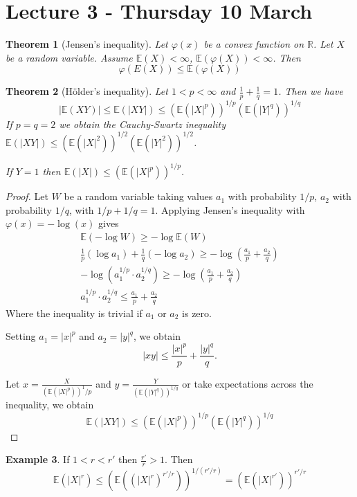 \documentclass[10pt, oneside, reqno]{amsart}
\theoremstyle{plain}%
\newtheorem{thm}{Theorem}[section]
\theoremstyle{definition}
\newtheorem{exmp}[thm]{Example}
\theoremstyle{remark}
\renewcommand{\phi}{\varphi}
\newcommand{\R}{\mathbb{R}}
\newcommand{\E}{\mathbb{E}}
\begin{document}

\section{Lecture 3 - Thursday 10 March} %
\label{sec:lecture_3_thursday_10_march}
\begin{thm}[Jensen's inequality]
	Let $\phi(x)$ be a convex function on $\R$.  Let $X$ be a random variable.  Assume $\E(X) < \infty$, $\E(\phi(X)) < \infty$.  Then \[
		\phi(E(X)) \leq \E(\phi(X))
	\]
\end{thm}

\begin{thm}[H\"older's inequality]
	Let $1 < p < \infty$ and $\frac{1}{p} + \frac{1}{q} = 1$. Then we have\[
		| \E(XY) | \leq \E(|XY|) \leq \left( \E(|X|^p) \right)^{1/p} \left( \E(|Y|^q) \right)^{1/q}
	\] 
	If $p = q = 2$ we obtain the Cauchy-Swartz inequality $\E(|XY|) \leq \left( \E(|X|^2) \right)^{1/2} \left( \E(|Y|^2) \right)^{1/2}$.
	
	If $Y = 1$ then $\E(|X|) \leq ( \E(|X|^p))^{1/p}$.
\end{thm}
\begin{proof}
	Let $W$ be a random variable taking values $a_1$ with probability $1/p$, $a_2$ with probability $1/q$, with $1/p + 1/q = 1$.  Applying Jensen's inequality with $\phi(x) = -\log(x)$ gives 
	\begin{align*}
		\E( - \log W) \geq -\log \E(W) \\
		\frac{1}{p} (\log a_1) + \frac{1}{q} ( -\log a_2) \geq -\log( \frac{a_1}{p} + \frac{a_2}{q}) \\
		-\log(a_1^{1/p} \cdot a_2^{1/q}) \geq -\log( \frac{a_1}{p} + \frac{a_2}{q})  \\
		a_1^{1/p} \cdot a_2^{1/q} \leq \frac{a_1}{p} + \frac{a_2}{q}
	\end{align*}
	Where the inequality is trivial if $a_1$ or $a_2$ is zero.
	
	Setting $a_1 = |x|^p$ and $a_2 = |y|^q$, we obtain \[
		|xy| \leq \frac{|x|^p}{p} + \frac{|y|^q}{q}.
	\]
	
	Let $x = \frac{X}{(\E(|X|^p))^1/p}$ and $y = \frac{Y}{(\E(|Y|^q))^{1/q}}$
or take expectations across the inequality, we obtain \[
	\E(|XY|) \leq \left( \E(|X|^p) \right)^{1/p} \left( \E(|Y|^q) \right)^{1/q}
\]
\end{proof}


\begin{exmp}
	If $1 < r < r'$ then $\frac{r'}{r} > 1$.  Then \[
		\E(|X|^r) \leq (\E((|X|^r)^{r'/r}))^{1/(r'/r)} = (\E(|X|^{r'}))^{r'/r}
	\]
\end{exmp}
\end{document}
